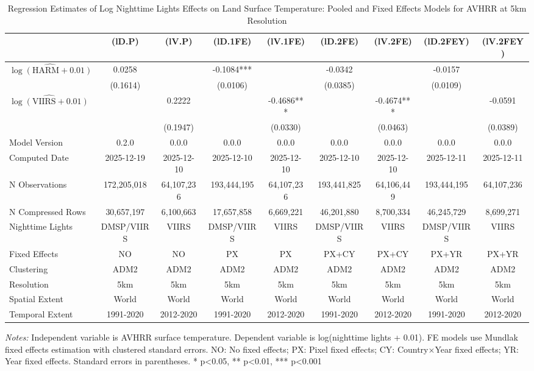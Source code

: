 \begin{table}[htbp]
\centering
\footnotesize
\caption{Regression Estimates of Log Nighttime Lights Effects on Land Surface Temperature: Pooled and Fixed Effects Models for AVHRR at 5km Resolution}
\begin{tabular}{lcccccccc}
\toprule
 & (lD.P) & (lV.P) & (lD.1FE) & (lV.1FE) & (lD.2FE) & (lV.2FE) & (lD.2FEY) & (lV.2FEY) \\
\midrule
$\hat{\log(\text{HARM} + 0.01)}$ & 0.0258 &  & -0.1084*** &  & -0.0342 &  & -0.0157 &  \\
 & (0.1614) &  & (0.0106) &  & (0.0385) &  & (0.0109) &  \\
$\hat{\log(\text{VIIRS} + 0.01)}$ &  & 0.2222 &  & -0.4686*** &  & -0.4674*** &  & -0.0591 \\
 &  & (0.1947) &  & (0.0330) &  & (0.0463) &  & (0.0389) \\
\midrule
Model Version & 0.2.0 & 0.0.0 & 0.0.0 & 0.0.0 & 0.0.0 & 0.0.0 & 0.0.0 & 0.0.0 \\
Computed Date & 2025-12-19 & 2025-12-10 & 2025-12-10 & 2025-12-10 & 2025-12-10 & 2025-12-10 & 2025-12-11 & 2025-12-11 \\
N Observations & 172,205,018 & 64,107,236 & 193,444,195 & 64,107,236 & 193,441,825 & 64,106,449 & 193,444,195 & 64,107,236 \\
N Compressed Rows & 30,657,197 & 6,100,663 & 17,657,858 & 6,669,221 & 46,201,880 & 8,700,334 & 46,245,729 & 8,699,271 \\
\midrule
Nighttime Lights & DMSP/VIIRS & VIIRS & DMSP/VIIRS & VIIRS & DMSP/VIIRS & VIIRS & DMSP/VIIRS & VIIRS \\
Fixed Effects & NO & NO & PX & PX & PX+CY & PX+CY & PX+YR & PX+YR \\
Clustering & ADM2 & ADM2 & ADM2 & ADM2 & ADM2 & ADM2 & ADM2 & ADM2 \\
\cmidrule(lr){1-9}
Resolution & 5km & 5km & 5km & 5km & 5km & 5km & 5km & 5km \\
Spatial Extent & World & World & World & World & World & World & World & World \\
Temporal Extent & 1991-2020 & 2012-2020 & 1991-2020 & 2012-2020 & 1991-2020 & 2012-2020 & 1991-2020 & 2012-2020 \\
\bottomrule
\end{tabular}
\begin{threeparttable}
\begin{tablenotes}\small
\item \textit{Notes:} Independent variable is AVHRR surface temperature. Dependent variable is log(nighttime lights + 0.01). FE models use Mundlak fixed effects estimation with clustered standard errors. NO: No fixed effects; PX: Pixel fixed effects; CY: Country×Year fixed effects; YR: Year fixed effects. Standard errors in parentheses. * p<0.05, ** p<0.01, *** p<0.001
\end{tablenotes}
\end{threeparttable}
\end{table}